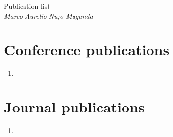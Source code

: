 \documentclass[letterpaper]{article}
\begin{document}
  \begin{flushleft}
 Publication list\\
    \emph{Marco Aurelio Nu;o Maganda}\\[0.5cm]
  \end{flushleft}


  \nocite{*}
  \printbibliography[title = {All my publications}]


  \section*{Conference publications}

  \begin{enumerate}
    \item {}
  \end{enumerate}

  \section*{Journal publications}

  \begin{enumerate}[resume]
    \item {}
  \end{enumerate}
\end{document}

